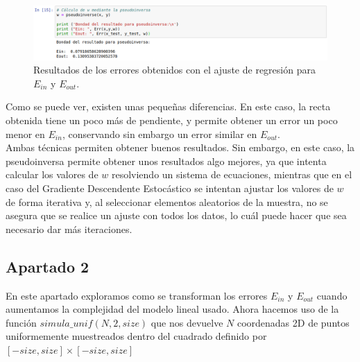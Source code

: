 \documentclass[11pt,a4paper]{article}
\begin{document}
\begin{figure}[H]
\centering
\includegraphics[scale=0.4]{img/pinv_error.png}
\caption{Resultados de los errores obtenidos con el ajuste de regresión para $E_{in}$ y $E_{out}$.}
\end{figure}

Como se puede ver, existen unas pequeñas diferencias. En este caso, la recta obtenida tiene un poco más de pendiente, y permite
obtener un error un poco menor en $E_{in}$, conservando sin embargo un error similar en $E_{out}$.\\

Ambas técnicas permiten obtener buenos resultados. Sin embargo, en este caso, la pseudoinversa permite obtener unos resultados
algo mejores, ya que intenta calcular los valores de $w$ resolviendo un sistema de ecuaciones, mientras que en el caso del
Gradiente Descendente Estocástico se intentan ajustar los valores de $w$ de forma iterativa y, al seleccionar elementos
aleatorios de la muestra, no se asegura que se realice un ajuste con todos los datos, lo cuál puede hacer que sea necesario
dar más iteraciones.

\subsection*{Apartado 2}
\noindent En este apartado exploramos como se transforman los errores $E_{in}$ y $E_{out}$ cuando aumentamos la complejidad
del modelo lineal usado. Ahora hacemos uso de la función $simula\_unif (N, 2, size)$ que nos devuelve $N$ coordenadas 2D de
puntos uniformemente muestreados dentro del cuadrado definido por $[-size, size] \times [-size, size]$
\end{document}
